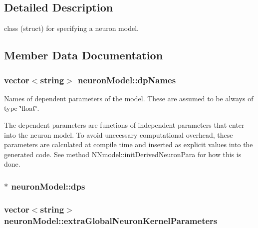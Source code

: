 \subsection{Detailed Description}
class (struct) for specifying a neuron model. 

\subsection{Member Data Documentation}
\hypertarget{structneuronModel_a051c0c704ce383c43cdf446accbeb201}{
\subsubsection[{dp\+Names}]{\setlength{\rightskip}{0pt plus 5cm}vector$<$string$>$ neuron\+Model\+::dp\+Names}}\label{structneuronModel_a051c0c704ce383c43cdf446accbeb201}


Names of dependent parameters of the model. These are assumed to be always of type \char`\"{}float\char`\"{}. 

The dependent parameters are functions of independent parameters that enter into the neuron model. To avoid unecessary computational overhead, these parameters are calculated at compile time and inserted as explicit values into the generated code. See method N\+Nmodel\+::init\+Derived\+Neuron\+Para for how this is done. \hypertarget{structneuronModel_a9b9b9e5e66702eb114b268bbd08d7c34}{
\subsubsection[{dps}]{$\ast$ neuron\+Model\+::dps}}\label{structneuronModel_a9b9b9e5e66702eb114b268bbd08d7c34}
\hypertarget{structneuronModel_a00094db5e89eaa5d8017d83d84c63676}{
\subsubsection[{extra\+Global\+Neuron\+Kernel\+Parameters}]{\setlength{\rightskip}{0pt plus 5cm}vector$<$string$>$ neuron\+Model\+::extra\+Global\+Neuron\+Kernel\+Parameters}}\label{structneuronModel_a00094db5e89eaa5d8017d83d84c63676}



